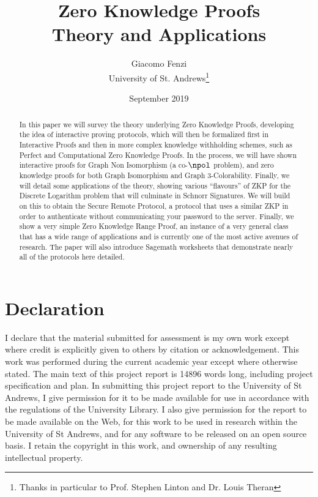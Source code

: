 \documentclass{article}
\title{Zero Knowledge Proofs \\ Theory and Applications}
\author{Giacomo Fenzi \\ University of St. Andrews\thanks{Thanks in particular to Prof. Stephen Linton and Dr. Louis Theran}}
\date{September 2019}
\begin{document}
\maketitle
\newpage

\begin{abstract}
    In this paper we will survey the theory underlying Zero Knowledge Proofs,
    developing the idea of interactive proving protocols, which will then be formalized first in Interactive Proofs
    and then in more complex knowledge withholding schemes, such as Perfect and Computational Zero Knowledge Proofs.
    In the process, we will have shown interactive proofs for Graph Non Isomorphism (a co-$\npol$ problem),
    and zero knowledge proofs for both Graph Isomorphism and Graph 3-Colorability.
    Finally, we will detail some applications of the theory, showing various \enquote{flavours} of ZKP for the Discrete Logarithm problem that will culminate in
    Schnorr Signatures. We will build on this to obtain the Secure Remote Protocol, a protocol that uses a similar ZKP in order
    to authenticate without communicating your password to the server. Finally, we show a very simple Zero Knowledge
    Range Proof, an instance of a very general class that has a wide range of applications and is currently one of the most active avenues of research.
    The paper will also introduce Sagemath worksheets that demonstrate nearly all of the protocols here detailed.
\end{abstract}

\section*{Declaration}
I declare that the material submitted for assessment is my own work except where credit is explicitly given to others
by citation or acknowledgement.
This work was performed during the current academic year except where otherwise stated.
The main text of this project report is 14896 words long, including project specification and plan.
In submitting this project report to the University of St Andrews, I give permission for it to be made available for use
in accordance with the regulations of the University Library. I also give permission for the report to be made
available on the Web, for this work to be used in research within the University of St Andrews,
and for any software to be released on an open source basis. I retain the copyright in this work, and ownership of any
resulting intellectual property.

\tableofcontents
\end{document}
